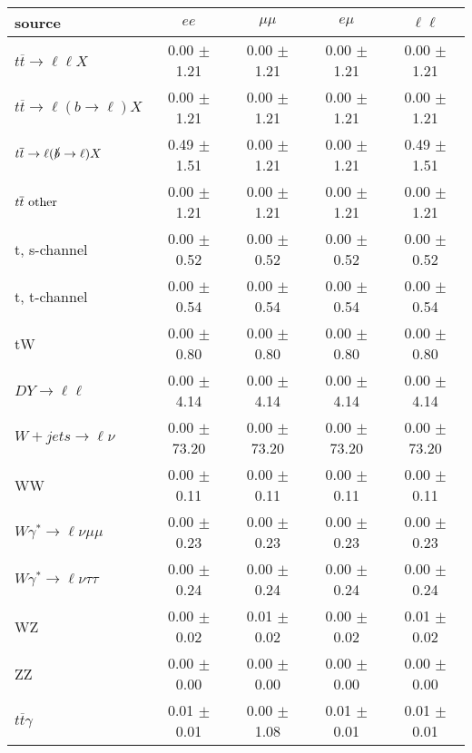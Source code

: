 \begin{tabular}{l|cccc} \hline\hline
source & $ee$ & $\mu\mu$ & $e\mu$ & $\ell\ell $ \\
\hline
$t\overline{t} \rightarrow \ell \ell X$ &  0.00 $\pm$  1.21 &  0.00 $\pm$  1.21 &  0.00 $\pm$  1.21 &  0.00 $\pm$  1.21 \\
$t\overline{t} \rightarrow \ell (b \rightarrow \ell) X$ &  0.00 $\pm$  1.21 &  0.00 $\pm$  1.21 &  0.00 $\pm$  1.21 &  0.00 $\pm$  1.21 \\
$t\overline{t} \rightarrow \ell (\slashed b \rightarrow \ell) X$ &  0.49 $\pm$  1.51 &  0.00 $\pm$  1.21 &  0.00 $\pm$  1.21 &  0.49 $\pm$  1.51 \\
        $t\overline{t}\ \rm{other}$ &  0.00 $\pm$  1.21 &  0.00 $\pm$  1.21 &  0.00 $\pm$  1.21 &  0.00 $\pm$  1.21 \\
\hline
                       t, s-channel &  0.00 $\pm$  0.52 &  0.00 $\pm$  0.52 &  0.00 $\pm$  0.52 &  0.00 $\pm$  0.52 \\
                       t, t-channel &  0.00 $\pm$  0.54 &  0.00 $\pm$  0.54 &  0.00 $\pm$  0.54 &  0.00 $\pm$  0.54 \\
                                 tW &  0.00 $\pm$  0.80 &  0.00 $\pm$  0.80 &  0.00 $\pm$  0.80 &  0.00 $\pm$  0.80 \\
\hline
         $DY \rightarrow \ell \ell$ &  0.00 $\pm$  4.14 &  0.00 $\pm$  4.14 &  0.00 $\pm$  4.14 &  0.00 $\pm$  4.14 \\
      $W+jets \rightarrow \ell \nu$ &  0.00 $\pm$ 73.20 &  0.00 $\pm$ 73.20 &  0.00 $\pm$ 73.20 &  0.00 $\pm$ 73.20 \\
                                 WW &  0.00 $\pm$  0.11 &  0.00 $\pm$  0.11 &  0.00 $\pm$  0.11 &  0.00 $\pm$  0.11 \\
\hline
$W\gamma^{*} \rightarrow \ell \nu \mu\mu$ &  0.00 $\pm$  0.23 &  0.00 $\pm$  0.23 &  0.00 $\pm$  0.23 &  0.00 $\pm$  0.23 \\
$W\gamma^{*} \rightarrow \ell \nu \tau\tau$ &  0.00 $\pm$  0.24 &  0.00 $\pm$  0.24 &  0.00 $\pm$  0.24 &  0.00 $\pm$  0.24 \\
                                 WZ &  0.00 $\pm$  0.02 &  0.01 $\pm$  0.02 &  0.00 $\pm$  0.02 &  0.01 $\pm$  0.02 \\
                                 ZZ &  0.00 $\pm$  0.00 &  0.00 $\pm$  0.00 &  0.00 $\pm$  0.00 &  0.00 $\pm$  0.00 \\
\hline
              $t\overline{t}\gamma$ &  0.01 $\pm$  0.01 &  0.00 $\pm$  1.08 &  0.01 $\pm$  0.01 &  0.01 $\pm$  0.01 \\

\end{tabular}
